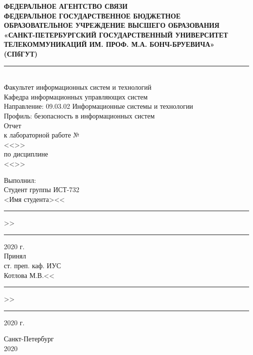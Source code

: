 \thispagestyle{empty}

\begin{center}
\small
\textbf{ФЕДЕРАЛЬНОЕ АГЕНТСТВО СВЯЗИ\\ \vspace{0.5em}
ФЕДЕРАЛЬНОЕ ГОСУДАРСТВЕННОЕ БЮДЖЕТНОЕ ОБРАЗОВАТЕЛЬНОЕ УЧРЕЖДЕНИЕ ВЫСШЕГО ОБРАЗОВАНИЯ\\
«САНКТ-ПЕТЕРБУРГСКИЙ ГОСУДАРСТВЕННЫЙ УНИВЕРСИТЕТ ТЕЛЕКОММУНИКАЦИЙ ИМ. ПРОФ. М.А. БОНЧ-БРУЕВИЧА»\\
(СПбГУТ)\\}
\normalsize
\rule{\linewidth}{1pt}\\
\vspace{1em}
Факультет информационных систем и технологий\\
Кафедра информационных управляющих систем\\
\vspace{2em}
Направление: 09.03.02 Информационные системы и технологии\\
Профиль: безопасность в информационных систем\\
\vspace{4em}
Отчет\\к лабораторной работе №\\
<<>>\\
по дисциплине\\
<<>>
\end{center}
\vspace{2em}
Выполнил:\\
Студент группы ИСТ-732\\
<Имя студента>\hfill<<\rule{2em}{0.5pt}>>\rule{4em}{0.5pt} 2020 г.\hspace*{3.5cm}
\vspace{1em}\\
Принял\\
ст. преп. каф. ИУС\\
Котлова М.В.\hfill<<\rule{2em}{0.5pt}>>\rule{4em}{0.5pt} 2020 г.\hspace*{3.5cm}
\vfill

\begin{center}
    Санкт-Петербург\\2020
\end{center}

\newpage
